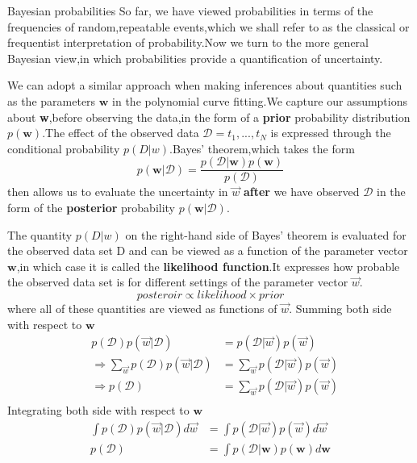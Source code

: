 Bayesian probabilities
So far, we have viewed probabilities in terms of the frequencies of random,repeatable events,which we shall refer to as the classical or frequentist interpretation of probability.Now we turn to the more general Bayesian view,in which probabilities provide a quantification of uncertainty.

We can adopt a similar approach when making inferences about quantities such as the parameters $\mathbf{w}$ in the polynomial curve fitting.We capture our assumptions about \textbf{w},before observing the data,in the form of a \textbf{prior} probability distribution $p(\mathbf{w})$.The effect of the observed data $\mathcal{D} = {t_1,...,t_N}$ is expressed through the conditional probability $p(D|w)$.Bayes' theorem,which takes the form
\begin{equation}
p(\textbf{w}|\mathcal{D}) = \frac{p(\mathcal{D}|\textbf{w})p(\textbf{w})}{p(\mathcal{D})}
\end{equation}
then allows us to evaluate the uncertainty in $\vec{w}$ \textbf{after} we have observed $\mathcal{D}$ in the form of the \textbf{posterior} probability $p(\mathbf{w}|\mathcal{D})$.

The quantity $p(D|w)$ on the right-hand side of Bayes' theorem is evaluated for the observed data set D and 
can be viewed as a function of the parameter vector $\mathbf{w}$,in which case it is called the \textbf{likelihood function}.It expresses how probable the observed data set is for different settings of the parameter vector $\vec{w}$.
\begin{equation}
posteroir \propto likelihood \times prior
\end{equation}
where all of these quantities are viewed as functions of $\vec{w}$.
Summing both side with respect to $\mathbf{w}$
\begin{align}
& p(\mathcal{D})p(\vec{w}|\mathcal{D}) &= p(\mathcal{D}|\vec{w})p(\vec{w}) \\
&\Rightarrow \sum_{\vec{w}}p(\mathcal{D})p(\vec{w}|\mathcal{D}) &= \sum_{\vec{w}}p(\mathcal{D}|\vec{w})p(\vec{w}) \\
&\Rightarrow p(\mathcal{D})&= \sum_{\vec{w}}p(\mathcal{D}|\vec{w})p(\vec{w}) \\
\end{align}
Integrating both side with respect to $\mathbf{w}$
\begin{align}
\int p(\mathcal{D})p(\vec{w}|\mathcal{D})d{\vec{w}} &= \int p(\mathcal{D}|\vec{w})p(\vec{w}) d{\vec{w}} \\ 
p(\mathcal{D}) &= \int p(\mathcal{D}|\mathbf{w}) p(\mathbf{w})d\mathbf{w} 
 \end{align}

